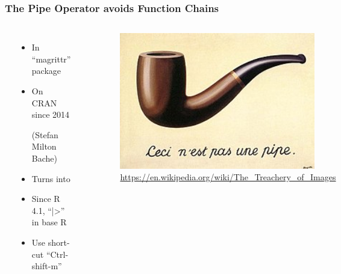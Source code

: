 \begin{frame}
	\frametitle{The Pipe Operator avoids Function Chains}
	\begin{columns}
		\centering\includegraphics[width=0.25\textwidth]{../figs/magrittr.png}
		
		\begin{itemize}
			\item In ``magrittr'' package
			\item On CRAN since 2014 
			
			(Stefan Milton Bache)
			\item Turns  into 
			\item Since R 4.1, ``|>'' in base R
			\item Use short-cut ``Ctrl-shift-m''
		\end{itemize}
		\begin{example}
		\end{example}
		\begin{figure}
			\includegraphics[width=0.9\textwidth]{pics/MagrittePipe.jpg}
			\caption{\url{https://en.wikipedia.org/wiki/The_Treachery_of_Images}}
		\end{figure}
	\end{columns}
\end{frame}


